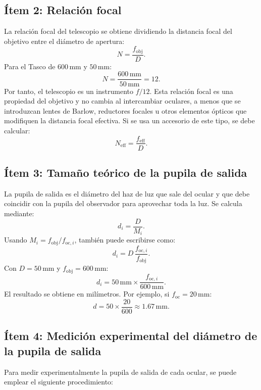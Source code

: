 \subsection{Ítem 2: Relación focal}

La relación focal del telescopio se obtiene dividiendo la distancia focal del objetivo entre el diámetro de apertura:
$$
N=\frac{f_{\mathrm{obj}}}{D}.
$$
Para el Tasco de $600\,\mathrm{mm}$ y $50\,\mathrm{mm}$:
$$
N=\frac{600\,\mathrm{mm}}{50\,\mathrm{mm}}=12.
$$
Por tanto, el telescopio es un instrumento $f/12$. Esta relación focal es una propiedad del objetivo y no cambia al intercambiar oculares, a menos que se introduzcan lentes de Barlow, reductores focales u otros elementos ópticos que modifiquen la distancia focal efectiva. Si se usa un accesorio de este tipo, se debe calcular:
$$
N_{\mathrm{eff}}=\frac{f_{\mathrm{eff}}}{D}.
$$

\subsection{Ítem 3: Tamaño teórico de la pupila de salida}

La pupila de salida es el diámetro del haz de luz que sale del ocular y que debe coincidir con la pupila del observador para aprovechar toda la luz. Se calcula mediante:
$$
d_i=\frac{D}{M_i}.
$$
Usando $M_i=f_{\mathrm{obj}}/f_{\mathrm{oc},i}$, también puede escribirse como:
$$
d_i=D\,\frac{f_{\mathrm{oc},i}}{f_{\mathrm{obj}}}.
$$
Con $D=50\,\mathrm{mm}$ y $f_{\mathrm{obj}}=600\,\mathrm{mm}$:
$$
d_i=50\,\mathrm{mm}\times\frac{f_{\mathrm{oc},i}}{600\,\mathrm{mm}}.
$$
El resultado se obtiene en milímetros. Por ejemplo, si $f_{\mathrm{oc}}=20\,\mathrm{mm}$:
$$
d=50\times\frac{20}{600}\approx 1.67\,\mathrm{mm}.
$$

\subsection{Ítem 4: Medición experimental del diámetro de la pupila de salida}

Para medir experimentalmente la pupila de salida de cada ocular, se puede emplear el siguiente procedimiento:

